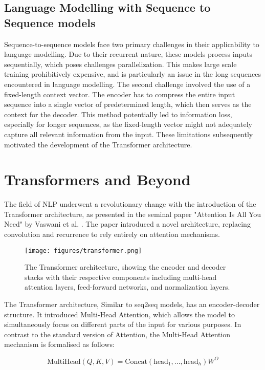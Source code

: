 \documentclass[a4paper, oneside]{discothesis}
\begin{document}
\subsection{Language Modelling with Sequence to Sequence models}
Sequence-to-sequence models face two primary challenges in their applicability to language modelling. Due to their recurrent nature, these models process inputs sequentially, which poses challenges parallelization. This makes large scale training prohibitively expensive, and is particularly an issue in the long sequences encountered in language modelling. The second challenge involved the use of a fixed-length context vector. The encoder has to compress the entire input sequence into a single vector of predetermined length, which then serves as the context for the decoder. This method potentially led to information loss, especially for longer sequences, as the fixed-length vector might not adequately capture all relevant information from the input. These limitations subsequently motivated the development of the Transformer architecture.


\section{Transformers and Beyond}
The field of NLP underwent a revolutionary change with the introduction of the Transformer architecture, as presented in the seminal paper "Attention Is All You Need" by Vaswani et al. \cite{vaswani2023attentionneed}. The paper introduced a novel architecture, replacing convolution and recurrence to rely entirely on attention mechanisms.

\begin{figure}[h]
    \centering
    \texttt{[image: figures/transformer.png]}
    \caption{The Transformer architecture, showing the encoder and decoder stacks with their respective components including multi-head attention layers, feed-forward networks, and normalization layers.}
    \label{fig:transformer_architecture}
\end{figure}


The Transformer architecture, Similar to seq2seq models, has an encoder-decoder structure. It introduced Multi-Head Attention, which allows the model to simultaneously focus on different parts of the input for various purposes. In contrast to the standard version of Attention, the Multi-Head Attention mechanism is formalised as follows:

\begin{equation}
\text{MultiHead}(Q, K, V) = \text{Concat}(\text{head}_1, ..., \text{head}_h)W^O
\end{equation}
\end{document}
